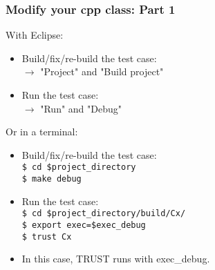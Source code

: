 \documentclass[10pt, hyperref={unicode=true,pdfusetitle, bookmarks=true,bookmarksnumbered=false,bookmarksopen=false, breaklinks=false,pdfborder={0 0 1},backref=true,colorlinks=true,linkcolor=darkblue,pageanchor, urlcolor=darkblue}]{beamer}
\begin{document}
\begin{frame}
\frametitle{Modify your cpp class: Part 1}

\begin{exampleblock}{With Eclipse:}
    \begin{itemize}
    \item Build/fix/re-build the test case:\\
    $\rightarrow$ "Project" and "Build project"\\
    \item Run the test case:\\
    $\rightarrow$ "Run" and "Debug"\\
    \end{itemize}
\end{exampleblock}

\begin{block}{Or in a terminal:}
    \begin{itemize}
    \item Build/fix/re-build the test case:\\
    \texttt{\$ cd \$project\_directory}\\
    \texttt{\$ make debug}\\
    \item Run the test case:\\
    \texttt{\$ cd \$project\_directory/build/Cx/}\\
    \texttt{\$ export exec=\$exec\_debug}\\
    \texttt{\$ trust Cx}
    \item In this case, TRUST runs with exec\_debug.
    \end{itemize}
\end{block}

\end{frame}
\end{document}
